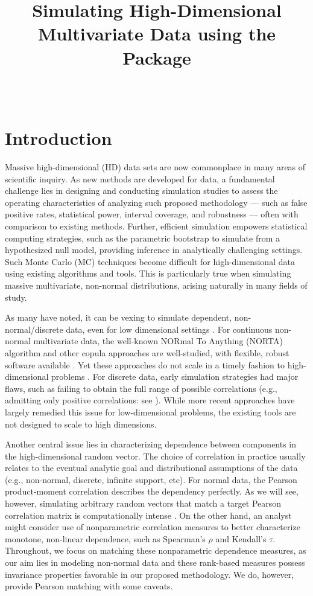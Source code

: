 \documentclass[
]{jss}
\author{
\\
}
\title{Simulating High-Dimensional Multivariate Data using the \pkg{Bigsimr} Package}
\begin{document}
\hypertarget{introduction}{%
\section{Introduction}\label{introduction}}

Massive high-dimensional (HD) data sets are now commonplace in many areas of scientific inquiry. As new methods are developed for data, a fundamental challenge lies in designing and conducting simulation studies to assess the operating characteristics of analyzing such proposed methodology --- such as false positive rates, statistical power, interval coverage, and robustness --- often with comparison to existing methods. Further, efficient simulation empowers statistical computing strategies, such as the parametric bootstrap \citep{Chernick2008} to simulate from a hypothesized null model, providing inference in analytically challenging settings. Such Monte Carlo (MC) techniques become difficult for high-dimensional data using existing algorithms and tools. This is particularly true when simulating massive multivariate, non-normal distributions, arising naturally in many fields of study.

As many have noted, it can be vexing to simulate dependent, non-normal/discrete data, even for low dimensional settings \citep{MB13, XZ19}. For continuous non-normal multivariate data, the well-known NORmal To Anything (NORTA) algorithm \citep{Cario1997} and other copula approaches \citep{Nelsen2007} are well-studied, with flexible, robust software available \citep{Yan2007, Chen2001}. Yet these approaches do not scale in a timely fashion to high-dimensional problems \citep{Li2019gpu}. For discrete data, early simulation strategies had major flaws, such as failing to obtain the full range of possible correlations (e.g., admitting only positive correlations: see \citet{Park1996}). While more recent approaches \citep{MB13, Xia17, BF17} have largely remedied this issue for low-dimensional problems, the existing tools are not designed to scale to high dimensions.

Another central issue lies in characterizing dependence between components in the high-dimensional random vector. The choice of correlation in practice usually relates to the eventual analytic goal and distributional assumptions of the data (e.g., non-normal, discrete, infinite support, etc). For normal data, the Pearson product-moment correlation describes the dependency perfectly. As we will see, however, simulating arbitrary random vectors that match a target Pearson correlation matrix is computationally intense \citep{Chen2001, Xia17}. On the other hand, an analyst might consider use of nonparametric correlation measures to better characterize monotone, non-linear dependence, such as Spearman's \(\rho\) and Kendall's \(\tau\). Throughout, we focus on matching these nonparametric dependence measures, as our aim lies in modeling non-normal data and these rank-based measures possess invariance properties favorable in our proposed methodology. We do, however, provide Pearson matching with some caveats.
\end{document}
